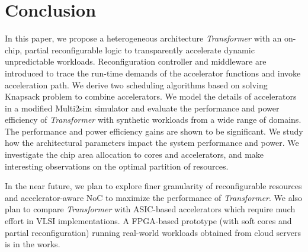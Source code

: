 \section{Conclusion}
\label{sec_concl}

In this paper, we propose a heterogeneous architecture {\em
  Transformer} with an on-chip, partial reconfigurable logic to
transparently accelerate dynamic unpredictable workloads.
Reconfiguration controller and middleware are introduced to trace the
run-time demands of the accelerator functions and invoke acceleration
path. We derive two scheduling algorithms based on solving Knapsack
problem to combine accelerators. We model the details of
accelerators in a modified Multi2sim simulator and evaluate the
performance and power efficiency of {\em Transformer} with synthetic
workloads from a wide range of domains. The performance and power
efficiency gains are shown to be significant. We study how the 
architectural parameters impact the system performance and power. We
investigate the chip area allocation to cores and accelerators, and make interesting observations on the optimal partition of resources. 

In the near future, we plan to explore finer granularity
of reconfigurable resources and accelerator-aware NoC to maximize the
performance of {\em Transformer}. We also plan to compare {\em Transformer}
with ASIC-based accelerators which require much effort in VLSI
implementations. A FPGA-based prototype (with soft cores and partial
reconfiguration) running real-world workloads obtained from cloud
servers is in the works.

